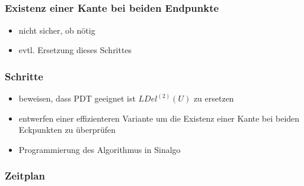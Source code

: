 \documentclass[compress]{beamer}
\begin{document}
\subsection{}
\begin{frame}
\frametitle{Existenz einer Kante bei beiden Endpunkte}
\begin{itemize}
	\item nicht sicher, ob nötig
	\item evtl. Ersetzung dieses Schrittes
\end{itemize}
\end{frame}

\begin{frame}
\frametitle{Schritte}
\begin{itemize}
	\item beweisen, dass PDT geeignet ist $LDel^{(2)}(U) $ zu ersetzen
	\item entwerfen einer effizienteren Variante um die Existenz einer Kante bei beiden Eckpunkten zu überprüfen 
	\item Programmierung des Algorithmus in Sinalgo
\end{itemize}
\end{frame}

\begin{frame}
\frametitle{Zeitplan}
\begin{table}[h]
\end{table}
\end{frame}
\end{document}

